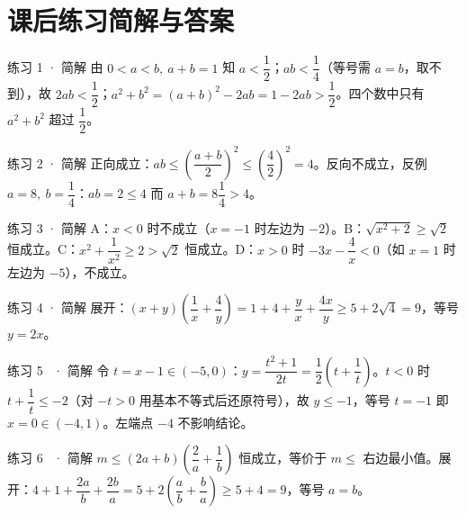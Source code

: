 \section*{课后练习\quad 简解与答案}

\begin{solution}{练习 1 · 简解}
由 $0<a<b,\ a+b=1$ 知 $a<\dfrac12$；$ab<\dfrac14$（等号需 $a=b$，取不到），故 $2ab<\dfrac12$；$a^2+b^2=(a+b)^2-2ab=1-2ab>\dfrac12$。四个数中只有 $a^2+b^2$ 超过 $\dfrac12$。
\end{solution}

\begin{solution}{练习 2 · 简解}
正向成立：$ab\le\left(\dfrac{a+b}2\right)^2\le\left(\dfrac42\right)^2=4$。反向不成立，反例 $a=8,\ b=\dfrac14$：$ab=2\le 4$ 而 $a+b=8\dfrac14>4$。
\end{solution}

\begin{solution}{练习 3 · 简解}
A：$x<0$ 时不成立（$x=-1$ 时左边为 $-2$）。B：$\sqrt{x^2+2}\ge\sqrt2$ 恒成立。C：$x^2+\dfrac1{x^2}\ge 2>\sqrt2$ 恒成立。D：$x>0$ 时 $-3x-\dfrac4x<0$（如 $x=1$ 时左边为 $-5$），不成立。
\end{solution}

\begin{solution}{练习 4 · 简解}
展开：$(x+y)\left(\dfrac1x+\dfrac4y\right)=1+4+\dfrac yx+\dfrac{4x}y\ge 5+2\sqrt4=9$，等号 $y=2x$。
\end{solution}

\begin{solution}{练习 5 \starred\ · 简解}
令 $t=x-1\in(-5,0)$：$y=\dfrac{t^2+1}{2t}=\dfrac12\left(t+\dfrac1t\right)$。$t<0$ 时 $t+\dfrac1t\le -2$（对 $-t>0$ 用基本不等式后还原符号），故 $y\le -1$，等号 $t=-1$ 即 $x=0\in(-4,1)$。左端点 $-4$ 不影响结论。
\end{solution}

\begin{solution}{练习 6 \starred\ · 简解}
$m\le(2a+b)\left(\dfrac2a+\dfrac1b\right)$ 恒成立，等价于 $m\le$ 右边最小值。展开：$4+1+\dfrac{2a}b+\dfrac{2b}a=5+2\left(\dfrac ab+\dfrac ba\right)\ge 5+4=9$，等号 $a=b$。
\end{solution}

